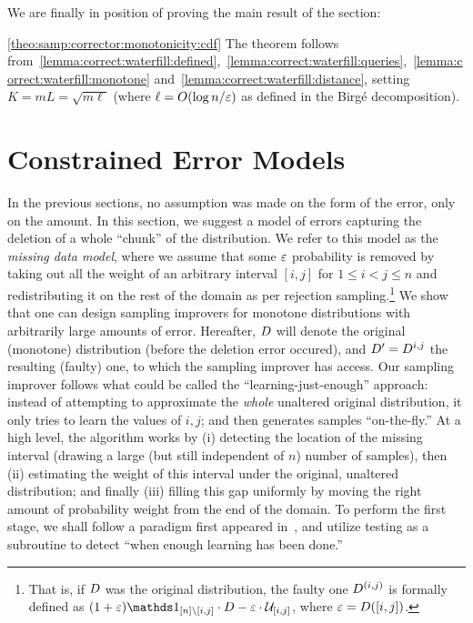 \noindent We are finally in position of proving the main result of the section:
\begin{proofof}{\autoref{theo:samp:corrector:monotonicity:cdf}}
The theorem follows from~\autoref{lemma:correct:waterfill:defined},~\autoref{lemma:correct:waterfill:queries},~\autoref{lemma:correct:waterfill:monotone} and~\autoref{lemma:correct:waterfill:distance}, setting $K=mL=\sqrt{m\ell}$ (where $\ell=\bigO{\log n/\eps}$ as defined in the Birg\'e decomposition).
\end{proofof}
\section{Constrained Error Models}\label{sec:specific:errors}
	In the previous sections, no assumption was made on the form of the error, only on the amount. 
In this section, we suggest a model of errors capturing the deletion of a whole ``chunk'' of the 
distribution. We refer to this model as the  \emph{missing data model}, where we assume that some $\varepsilon$ probability is removed by taking out all the weight of an arbitrary interval $[i,j]$ for $1\leq i<j\leq n$
and redistributing it on the rest of the domain as per rejection sampling.\footnote{ That is, if $D$ was the original distribution, 
the faulty one $D^{(i,j)}$ is formally defined as $(1+\eps)\indicSet{[n]\setminus[i,j]}\cdot\D - \eps\cdot\uniform_{[i,j]}$, where $\varepsilon=D([i,j])$.}
We show that one can design sampling improvers for monotone distributions
with arbitrarily large amounts of error. Hereafter, $D$ will denote the original (monotone) distribution (before the deletion error occured), and $D^\prime=D^{i,j}$ the resulting (faulty) one, to which the sampling improver has access.
Our sampling improver follows what could be called the ``learning-just-enough'' approach: instead of attempting to approximate the \emph{whole} unaltered original distribution, it only tries to learn the values of $i,j$; and then generates samples ``on-the-fly.'' At a high level, the algorithm works by \textsf{(i)} detecting the location of the missing interval (drawing a large (but still independent of $n$) number of samples), then \textsf{(ii)} estimating the weight of this interval under the original, unaltered distribution; and finally \textsf{(iii)} filling this gap uniformly by moving the right amount of probability weight from the end of the domain. To perform the first stage, we shall follow a paradigm first appeared in~\cite{DDS:12}, and utilize testing as a subroutine to detect ``when enough learning has been done.'' \medskip

